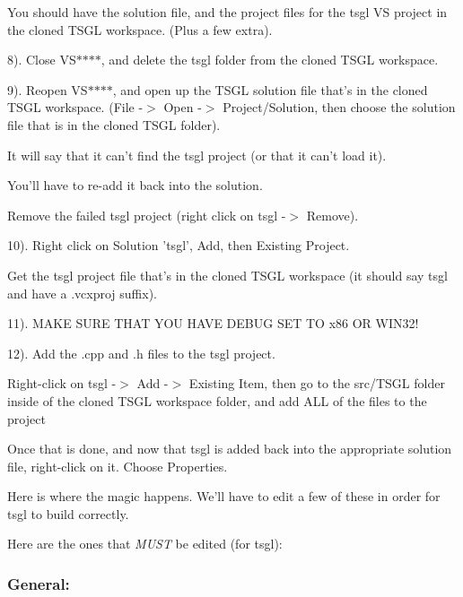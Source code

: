 You should have the solution file, and the project files for the {\ttfamily tsgl} V\-S project in the cloned T\-S\-G\-L workspace. (Plus a few extra).

8). Close V\-S$\ast$$\ast$$\ast$$\ast$, and delete the {\ttfamily tsgl} folder from the cloned T\-S\-G\-L workspace.

9). Reopen V\-S$\ast$$\ast$$\ast$$\ast$, and open up the T\-S\-G\-L solution file that's in the cloned T\-S\-G\-L workspace. ({\ttfamily File -\/$>$ Open -\/$>$ Project/\-Solution}, then choose the solution file that is in the cloned T\-S\-G\-L folder).

It will say that it can't find the {\ttfamily tsgl} project (or that it can't load it).

You'll have to re-\/add it back into the solution.

Remove the failed {\ttfamily tsgl} project ({\ttfamily right click on tsgl -\/$>$ Remove}).

10). Right click on {\ttfamily Solution 'tsgl'}, {\ttfamily Add}, then {\ttfamily Existing Project}.

Get the {\ttfamily tsgl} project file that's in the cloned T\-S\-G\-L workspace (it should say {\ttfamily tsgl} and have a {\ttfamily .vcxproj} suffix).

11). M\-A\-K\-E S\-U\-R\-E T\-H\-A\-T Y\-O\-U H\-A\-V\-E D\-E\-B\-U\-G S\-E\-T T\-O x86 O\-R W\-I\-N32!

12). Add the {\ttfamily .cpp} and {\ttfamily .h} files to the {\ttfamily tsgl} project.

{\ttfamily Right-\/click on tsgl -\/$>$ Add -\/$>$ Existing Item}, then go to the {\ttfamily src/\-T\-S\-G\-L} folder inside of the cloned T\-S\-G\-L workspace folder, and add A\-L\-L of the files to the project

Once that is done, and now that {\ttfamily tsgl} is added back into the appropriate solution file, right-\/click on it. Choose {\ttfamily Properties}.

Here is where the magic happens. We'll have to edit a few of these in order for {\ttfamily tsgl} to build correctly.

Here are the ones that {\itshape M\-U\-S\-T} be edited (for {\ttfamily tsgl})\-:

\subsubsection*{General\-:}


